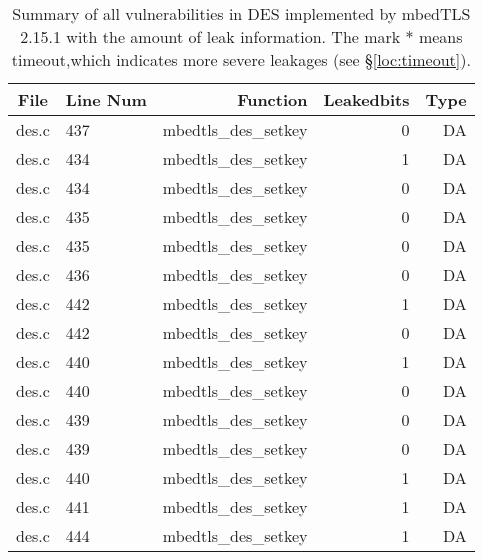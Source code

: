 \begin{table}%
\centering\tiny
\caption{Summary of all vulnerabilities in DES implemented by mbedTLS 2.15.1 with the amount of leak information. The mark $*$ means timeout,which indicates more severe leakages (see \S\ref{loc:timeout}).}\label{tab:DESmbedTLS}
\begin{tabular}{clrrr}
\hline
\textbf{File} & \textbf{Line Num} & \textbf{Function} & \textbf{Leakedbits} & \textbf{Type} \\\hline
des.c& 437&mbedtls\_des\_setkey&0 &DA\\
des.c& 434&mbedtls\_des\_setkey&1 &DA\\
des.c& 434&mbedtls\_des\_setkey&0 &DA\\
des.c& 435&mbedtls\_des\_setkey&0 &DA\\
des.c& 435&mbedtls\_des\_setkey&0 &DA\\
des.c& 436&mbedtls\_des\_setkey&0 &DA\\
des.c& 442&mbedtls\_des\_setkey&1 &DA\\
des.c& 442&mbedtls\_des\_setkey&0 &DA\\
des.c& 440&mbedtls\_des\_setkey&1 &DA\\
des.c& 440&mbedtls\_des\_setkey&0 &DA\\
des.c& 439&mbedtls\_des\_setkey&0 &DA\\
des.c& 439&mbedtls\_des\_setkey&0 &DA\\
des.c& 440&mbedtls\_des\_setkey&1 &DA\\
des.c& 441&mbedtls\_des\_setkey&1 &DA\\
des.c& 444&mbedtls\_des\_setkey&1 &DA\\
\hline
\end{tabular}
\end{table}
